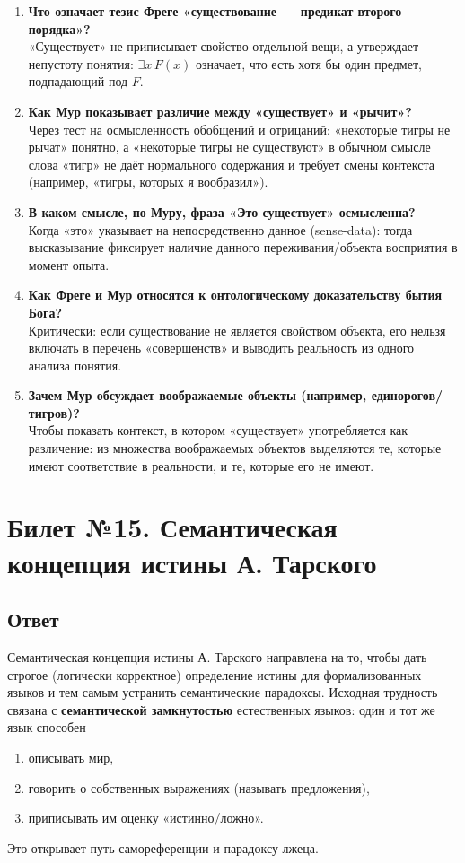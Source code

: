 \documentclass[a4paper,12pt]{article}
\begin{document}
\begin{enumerate}
    \item \textbf{Что означает тезис Фреге «существование — предикат второго порядка»?}\\
    «Существует» не приписывает свойство отдельной вещи, а утверждает непустоту понятия: $ \exists x\, F(x)$ означает, что есть хотя бы один предмет, подпадающий под $F$.
    \item \textbf{Как Мур показывает различие между «существует» и «рычит»?}\\
    Через тест на осмысленность обобщений и отрицаний: «некоторые тигры не рычат» понятно, а «некоторые тигры не существуют» в обычном смысле слова «тигр» не даёт нормального содержания и требует смены контекста (например, «тигры, которых я вообразил»).
    \item \textbf{В каком смысле, по Муру, фраза «Это существует» осмысленна?}\\
    Когда «это» указывает на непосредственно данное (sense-data): тогда высказывание фиксирует наличие данного переживания/объекта восприятия в момент опыта.
    \item \textbf{Как Фреге и Мур относятся к онтологическому доказательству бытия Бога?}\\
    Критически: если существование не является свойством объекта, его нельзя включать в перечень «совершенств» и выводить реальность из одного анализа понятия.
    \item \textbf{Зачем Мур обсуждает воображаемые объекты (например, единорогов/тигров)?}\\
    Чтобы показать контекст, в котором «существует» употребляется как различение: из множества воображаемых объектов выделяются те, которые имеют соответствие в реальности, и те, которые его не имеют.
\end{enumerate}

\newpage
\section{Билет №15. Семантическая концепция истины А. Тарского}

\subsection{Ответ}

Семантическая концепция истины А. Тарского направлена на то, чтобы дать строгое (логически корректное) определение истины для формализованных языков и тем самым устранить семантические парадоксы. Исходная трудность связана с \textbf{семантической замкнутостью} естественных языков: один и тот же язык способен
\begin{enumerate}
    \item описывать мир,
    \item говорить о собственных выражениях (называть предложения),
    \item приписывать им оценку «истинно/ложно».
\end{enumerate}
Это открывает путь самореференции и парадоксу лжеца.
\end{document}

